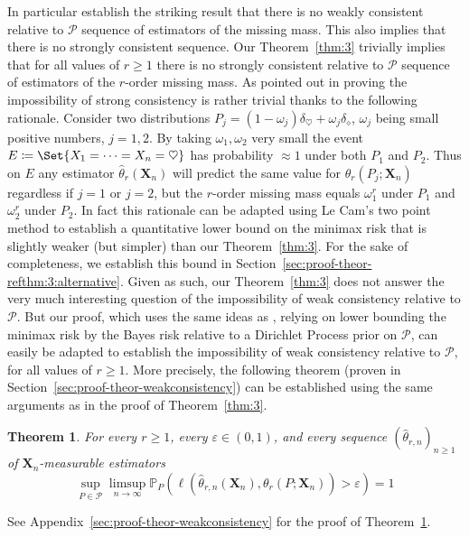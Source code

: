 \documentclass{article}
\newtheorem{theorem}{Theorem}
\newcommand{\1}{\boldsymbol{1}}
\newcommand{\PP}{\mathbb{P}}
\theoremstyle{plain}
\begin{document}
  In particular \cite{Mos(15)} establish the striking result that there is no weakly consistent relative to $\mathcal{P}$ sequence of estimators of the missing mass.  This also implies that there is no strongly consistent sequence. Our Theorem~\ref{thm:3} trivially implies that for all values of $r\geq 1$ there is no strongly consistent relative to $\mathcal{P}$ sequence of estimators of the $r$-order missing mass. As pointed out in \cite[Section~3.1]{Mos(15)} proving the impossibility of strong consistency is rather trivial thanks to the following rationale. Consider two distributions $P_j = (1- \omega_j)\delta_{\heartsuit} + \omega_j \delta_{\diamond}$, $\omega_j$ being small positive numbers, $j=1,2$. By taking $\omega_1,\omega_2$ very small the event $E \coloneqq \Set{X_1=\dots=X_n = \heartsuit}$ has probability $\approx 1$ under both $P_1$ and $P_2$. Thus on $E$ any estimator $\hat\theta_r(\mathbf{X}_n)$ will predict the same value for $\theta_r(P_j;\mathbf{X}_n)$ regardless if $j=1$ or $j=2$, but the $r$-order missing mass equals $\omega_{1}^r$ under $P_1$ and $\omega_2^r$ under $P_2$. In fact this rationale can be adapted using Le Cam's two point method to establish a quantitative lower bound on the minimax risk that is slightly weaker (but simpler) than our Theorem~\ref{thm:3}. For the sake of completeness, we establish this bound in Section~\ref{sec:proof-theor-refthm:3:alternative}. Given as such, our Theorem~\ref{thm:3} does not answer the very much interesting question of the impossibility of weak consistency relative to $\mathcal{P}$. But our proof, which uses the same ideas as \cite{Fad(18)}, relying on lower bounding the minimax risk by the Bayes risk relative to a Dirichlet Process prior on $\mathcal{P}$, can easily be adapted to establish the impossibility of weak consistency relative to $\mathcal{P}$, for all values of $r\geq 1$. More precisely, the following theorem (proven in Section~\ref{sec:proof-theor-weakconsistency}) can be established using the same arguments as in the proof of Theorem~\ref{thm:3}.%
  \begin{theorem}
    \label{thm:impossibility-weak-consistency}
    For every $r\geq 1$, every $\varepsilon \in (0,1)$, and every sequence $(\hat\theta_{r,n})_{n\geq 1}$ of $\mathbf{X}_n$-measurable estimators
    \begin{equation*}
      \sup_{P\in \mathcal{P}}\limsup_{n\to \infty}\PP_P\left( \ell(\hat{\theta}_{r,n}(\mathbf{X}_{n}),\theta_r(P;\mathbf{X}_{n})) >   \varepsilon \right) = 1
    \end{equation*}
  \end{theorem}
  See Appendix~\ref{sec:proof-theor-weakconsistency} for the proof of Theorem~\ref{thm:impossibility-weak-consistency}.
\end{document}
